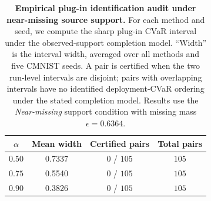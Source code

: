 \begin{table}[t]
\centering
\small
\caption{\textbf{Empirical plug-in identification audit under near-missing source support.} For each method and seed, we compute the sharp plug-in CVaR interval under the observed-support completion model. ``Width'' is the interval width, averaged over all methods and five CMNIST seeds. A pair is certified when the two run-level intervals are disjoint; pairs with overlapping intervals have no identified deployment-CVaR ordering under the stated completion model. Results use the \emph{Near-missing} support condition with missing mass $\epsilon=0.6364$.}
\label{tab:identification-audit-near-missing-tail}
\begin{tabular}{@{}cccc@{}}
\toprule
$\alpha$ & Mean width & Certified pairs & Total pairs \\
\midrule
$0.50$ & 0.7337 & 0 / $105$ & $105$ \\
$0.75$ & 0.5540 & 0 / $105$ & $105$ \\
$0.90$ & 0.3826 & 0 / $105$ & $105$ \\
\bottomrule
\end{tabular}
\end{table}
